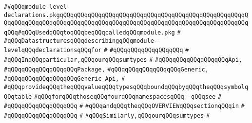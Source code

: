 \label{src/lib/compiler/front/typer-stuff/modules/module-level-declarations.pkg}
\verb|##qQQqmodule-level-declarations.pkgqQQqqQQqqQQqqQQqqQQqqQQqqQQqqQQqqQQqqQQqqQQqqQQqqQQqqQQqqQQqqQQqqQQqqQQqqQQqqQQqqQQqqQQqqQQqqQQqqQQqqQQqqQQqqQQqqQQqqQQqqQQqqQQq#qQQqUsedqQQqtoqQQqbeqQQqcalledqQQqmodule.pkg|\newline
\verb|#|\newline
\verb|#qQQqDatastructuresqQQqdescribingqQQqmodule-levelqQQqdeclarationsqQQqfor|\newline
\verb|#|\newline
\verb|#qQQqqQQqqQQqqQQqqQQq|\newline
\verb|#|\newline
\verb|#qQQqInqQQqparticular,qQQqourqQQqsumtypes|\newline
\verb|#|\newline
\verb|#qQQqqQQqqQQqqQQqqQQqApi,|\newline
\verb|#qQQqqQQqqQQqqQQqqQQqPackage,|\newline
\verb|#qQQqqQQqqQQqqQQqqQQqGeneric,|\newline
\verb|#qQQqqQQqqQQqqQQqqQQqGeneric_Api,|\newline
\verb|#|\newline
\verb|#qQQqprovideqQQqtheqQQqvalueqQQqtypesqQQqboundqQQqbyqQQqtheqQQqsymbolqQQqtable|\newline
\verb|#qQQqforqQQqthoseqQQqfourqQQqnamespacesqQQq--qQQqsee|\newline
\verb|#|\newline
\verb|#qQQqqQQqqQQqqQQqqQQq|\newline
\verb|#|\newline
\verb|#qQQqandqQQqtheqQQqOVERVIEWqQQqsectionqQQqin|\newline
\verb|#|\newline
\verb|#qQQqqQQqqQQqqQQqqQQq|\newline
\verb|#|\newline
\verb|#qQQqSimilarly,qQQqourqQQqsumtypes|\newline
\verb|#|\newline
